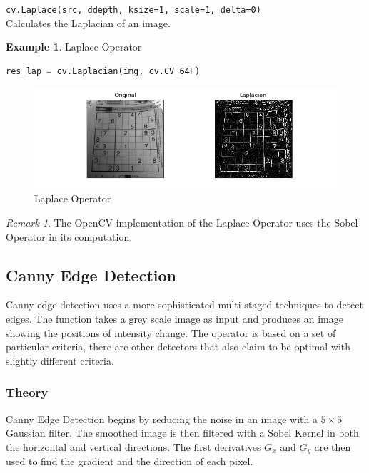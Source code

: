 \documentclass{article}
\theoremstyle{definition}
\newtheorem{ex}{Example}[subsection]
\theoremstyle{remark}
\newtheorem*{rem}{Remark}
\newcommand{\func}[2]{\noindent\lstinline{#1}\\#2}
\begin{document}
\func{cv.Laplace(src, ddepth, ksize=1, scale=1, delta=0)}{Calculates the Laplacian of an image.}

\begin{ex} Laplace Operator
\begin{lstlisting}[language=Python]
res_lap = cv.Laplacian(img, cv.CV_64F)
\end{lstlisting}
\begin{figure}[H]
    \centering
    \includegraphics[width=\textwidth]{ocv_laplace}
    \caption{Laplace Operator}
    \label{fig:ocv_lap}
\end{figure}
\end{ex}

\begin{rem}
The OpenCV implementation of the Laplace Operator uses the Sobel Operator in its computation.
\end{rem}


\break


\subsection{Canny Edge Detection}

Canny edge detection uses a more sophisticated multi-staged techniques to detect edges. The function takes a grey scale image as input and produces an image showing the positions of intensity change. The operator is based on a set of particular criteria, there are other detectors that also claim to be optimal with slightly different criteria.

\subsubsection{Theory}

Canny Edge Detection begins by reducing the noise in an image with a $ 5 \times 5 $ Gaussian filter. The smoothed image is then filtered with a Sobel Kernel in both the horizontal and vertical directions. The first derivatives $ G_x \text{ and } G_y $ are then used to find the gradient and the direction of each pixel.\\
\end{document}
